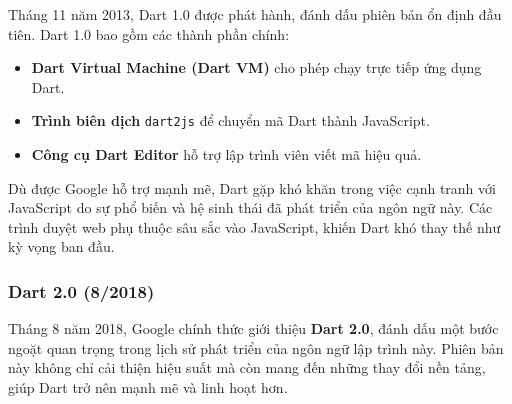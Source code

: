 \documentclass[../DoAn.tex]{subfiles}
\numberwithin{figure}{chapter}
\begin{document}
Tháng 11 năm 2013, Dart 1.0 được phát hành, đánh dấu phiên bản ổn định đầu tiên. Dart 1.0 bao gồm các thành phần chính:

\begin{itemize}
    \item \textbf{Dart Virtual Machine (Dart VM)} cho phép chạy trực tiếp ứng dụng Dart.
    \item \textbf{Trình biên dịch} \texttt{dart2js} để chuyển mã Dart thành JavaScript.
    \item \textbf{Công cụ Dart Editor} hỗ trợ lập trình viên viết mã hiệu quả.
\end{itemize}

Dù được Google hỗ trợ mạnh mẽ, Dart gặp khó khăn trong việc cạnh tranh với JavaScript do sự phổ biến và hệ sinh thái đã phát triển của ngôn ngữ này. Các trình duyệt web phụ thuộc sâu sắc vào JavaScript, khiến Dart khó thay thế như kỳ vọng ban đầu.

\subsubsection{Dart 2.0 (8/2018)}

Tháng 8 năm 2018, Google chính thức giới thiệu \textbf{Dart 2.0}, đánh dấu một bước ngoặt quan trọng trong lịch sử phát triển của ngôn ngữ lập trình này. Phiên bản này không chỉ cải thiện hiệu suất mà còn mang đến những thay đổi nền tảng, giúp Dart trở nên mạnh mẽ và linh hoạt hơn.
\end{document}
